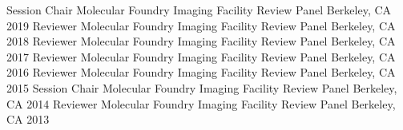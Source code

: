 \begin{cvhonors}
  \cvhonor
    {Session Chair}
    {Molecular Foundry Imaging Facility Review Panel}
    {Berkeley, CA}
    {2019}
  \cvhonor
    {Reviewer}
    {Molecular Foundry Imaging Facility Review Panel}
    {Berkeley, CA}
    {2018}
  \cvhonor
    {Reviewer}
    {Molecular Foundry Imaging Facility Review Panel}
    {Berkeley, CA}
    {2017}
  \cvhonor
    {Reviewer}
    {Molecular Foundry Imaging Facility Review Panel}
    {Berkeley, CA}
    {2016}
  \cvhonor
    {Reviewer}
    {Molecular Foundry Imaging Facility Review Panel}
    {Berkeley, CA}
    {2015}
  \cvhonor
    {Session Chair}
    {Molecular Foundry Imaging Facility Review Panel}
    {Berkeley, CA}
    {2014}
  \cvhonor
    {Reviewer}
    {Molecular Foundry Imaging Facility Review Panel}
    {Berkeley, CA}
    {2013}
\end{cvhonors}
